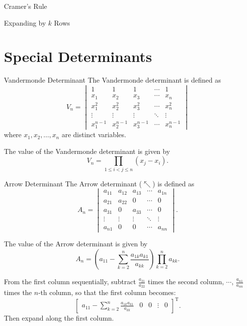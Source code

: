 \documentclass[11pt]{../../TexTemplate/elegantbook} %
\begin{document}
\begin{leftbarTitle}{Cramer's Rule}\end{leftbarTitle}

\begin{leftbarTitle}{Expanding by \(k\) Rows}\end{leftbarTitle}

\section{Special Determinants} %
\begin{definition}{Vandermonde Determinant}
    The Vandermonde determinant is defined as
    \[
    V_n = \begin{vmatrix}
    1 & 1 & 1 & \cdots & 1 \\
    x_1 & x_2 & x_3 & \cdots & x_n \\
    x_1^2 & x_2^2 & x_3^2 & \cdots & x_n^2 \\
    \vdots & \vdots & \vdots & \ddots & \vdots \\
    x_1^{n-1} & x_2^{n-1} & x_3^{n-1} & \cdots & x_n^{n-1}
    \end{vmatrix}
    \]
    where \( x_1, x_2, \ldots, x_n \) are distinct variables.
\end{definition}

The value of the Vandermonde determinant is given by
\[
V_n = \prod_{1 \leq i < j \leq n} (x_j - x_i).
\]  

\begin{definition}{Arrow Determinant}
    The Arrow determinant (\(\nwarrow\)) is defined as
    \[
    A_n = \begin{vmatrix}
    a_{11} & a_{12} & a_{13} & \cdots & a_{1n} \\
    a_{21} & a_{22} & 0 & \cdots & 0 \\
    a_{31} & 0 & a_{33} & \cdots & 0 \\
    \vdots & \vdots & \vdots & \ddots & \vdots \\
    a_{n1} & 0 & 0 & \cdots & a_{nn}
    \end{vmatrix}.
    \]

    The value of the Arrow determinant is given by
    \[
    A_n = \left( a_{11}- \sum_{k=2}^{n} \frac{a_{1k}a_{k1}}{a_{kk}}  \right)\prod_{k=2}^{n} a_{kk}.
    \]
\end{definition}

From the first column sequentially, subtract \( \frac{a_{21}}{a_{22}} \) times the second column, \(\cdots\), 
\( \frac{a_{n1}}{a_{nn}} \) times the \( n \)-th column, so that the first column becomes:
\[
\begin{bmatrix}
a_{11} - \sum\limits_{k=2}^n \frac{a_{1k}a_{k1}}{a_{kk}} &
0 &
0 &
\vdots &
0
\end{bmatrix}^{\mathrm{T}}.
\]
Then expand along the first column.
\end{document}
